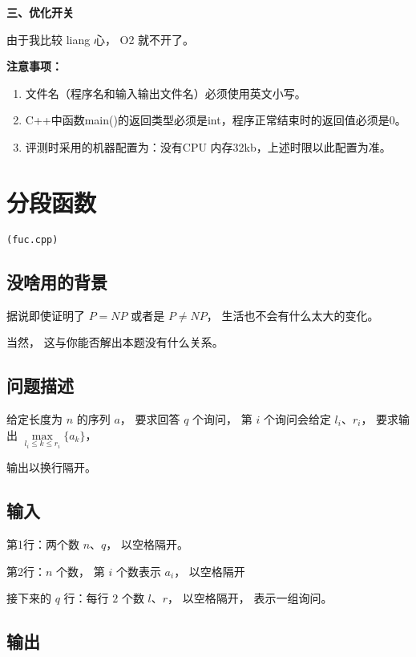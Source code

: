 \documentclass[UTF8]{ctexart}
\begin{document}
\textbf{三、优化开关}
\begin{center}
由于我比较 liang 心， O2 就不开了。
\end{center}

\textbf{注意事项：}
\begin{enumerate}
    \item{文件名（程序名和输入输出文件名）必须使用英文小写。}
    \item{C++中函数main()的返回类型必须是int，程序正常结束时的返回值必须是0。}
    \item{评测时采用的机器配置为：没有CPU 内存32kb，上述时限以此配置为准。}
\end{enumerate}

\newpage
\setcounter{page}{1}
\pagestyle{plain}

\newpage
\section{分段函数}
\begin{center}
\tt\large{(fuc.cpp)}
\end{center}

\subsection{没啥用的背景}

据说即使证明了 $P=NP$ 或者是 $P\neq NP$， 生活也不会有什么太大的变化。

当然， 这与你能否解出本题没有什么关系。

\subsection{问题描述}

给定长度为 $n$ 的序列 $a$， 要求回答 $q$ 个询问， 第 $i$ 个询问会给定 $l_i、r_i$， 要求输出 $\max\limits_{l_i\le k \le r_i} \lbrace a_k \rbrace$， 

输出以换行隔开。

\subsection{输入}

第1行：两个数 $n$、$q$， 以空格隔开。

第2行：$n$ 个数， 第 $i$ 个数表示 $a_i$， 以空格隔开

接下来的 $q$ 行：每行 $2$ 个数 $l$、$r$， 以空格隔开， 表示一组询问。

\subsection{输出}
\end{document}
